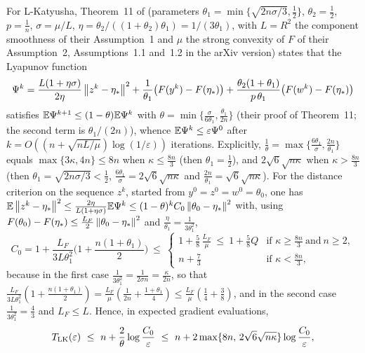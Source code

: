 For L-Katyusha, Theorem~11 of \cite{kovalev2020dont} (parameters $\theta_1=\min\{\sqrt{2n\sigma/3},\frac12\}$, $\theta_2=\frac12$, $p=\frac1n$, $\sigma=\mu/L$, $\eta=\theta_2/((1+\theta_2)\theta_1)=1/(3\theta_1)$, with $L=R^2$ the component smoothness of their Assumption~1 and $\mu$ the strong convexity of $F$ of their Assumption~2, Assumptions~1.1 and~1.2 in the arXiv version) states that the Lyapunov function
\[
\Psi^k=\frac{L(1+\eta\sigma)}{2\eta}\left\|z^k-\eta_\ast\right\|^2+\frac1{\theta_1}\big(F(y^k)-F(\eta_\ast)\big)+\frac{\theta_2(1+\theta_1)}{p\,\theta_1}\big(F(w^k)-F(\eta_\ast)\big)
\]
satisfies $\mathbb{E}\Psi^{k+1}\le(1-\theta)\mathbb{E}\Psi^k$ with $\theta=\min\{\frac{\sigma}{6\theta_1},\frac{\theta_1}{2n}\}$ (their proof of Theorem~11; the second term is $\theta_1/(2n)$), whence $\mathbb{E}\Psi^k\le\varepsilon\Psi^0$ after $k=O((n+\sqrt{nL/\mu})\log(1/\varepsilon))$ iterations. Explicitly, $\frac1\theta=\max\{\frac{6\theta_1}\sigma,\frac{2n}{\theta_1}\}$ equals $\max\{3\kappa,4n\}\le8n$ when $\kappa\le\frac{8n}3$ (then $\theta_1=\frac12$), and $2\sqrt6\sqrt{n\kappa}$ when $\kappa>\frac{8n}3$ (then $\theta_1=\sqrt{2n\sigma/3}<\frac12$, $\frac{6\theta_1}\sigma=2\sqrt6\sqrt{n\kappa}$ and $\frac{2n}{\theta_1}=\sqrt6\sqrt{n\kappa}$). For the distance criterion on the sequence $z^k$, started from $y^0=z^0=w^0=\theta_0$, one has $\mathbb{E}\left\|z^k-\eta_\ast\right\|^2\le\frac{2\eta}{L(1+\eta\sigma)}\mathbb{E}\Psi^k\le(1-\theta)^kC_0\left\|\theta_0-\eta_\ast\right\|^2$ with, using $F(\theta_0)-F(\eta_\ast)\le\frac{L_F}2\left\|\theta_0-\eta_\ast\right\|^2$ and $\frac{\eta}{\theta_1}=\frac1{3\theta_1^2}$,
\begin{equation}
\label{eq:LKconst}
C_0=1+\frac{L_F}{3L\theta_1^2}\Big(1+\frac{n(1+\theta_1)}2\Big)\ \le\ \begin{cases}1+\frac58\,\frac{L_F}{\mu}\ \le\ 1+\frac58Q&\text{if }\kappa\ge\frac{8n}3\ \text{and}\ n\ge2,\\[3pt] n+\frac73&\text{if }\kappa<\frac{8n}3,\end{cases}
\end{equation}
because in the first case $\frac1{3\theta_1^2}=\frac1{2\sigma n}=\frac\kappa{2n}$, so that $\frac{L_F}{3L\theta_1^2}(1+\frac{n(1+\theta_1)}2)=\frac{L_F}\mu(\frac1{2n}+\frac{1+\theta_1}4)\le\frac{L_F}\mu(\frac14+\frac38)$, and in the second case $\frac1{3\theta_1^2}=\frac43$ and $L_F\le L$. Hence, in expected gradient evaluations,
\begin{equation}
\label{eq:LKupper}
T_{\rm LK}(\varepsilon)\ \le\ n+\frac2\theta\log\frac{C_0}\varepsilon\ \le\ n+2\max\{8n,\,2\sqrt6\sqrt{n\kappa}\}\log\frac{C_0}\varepsilon ,
\end{equation}
